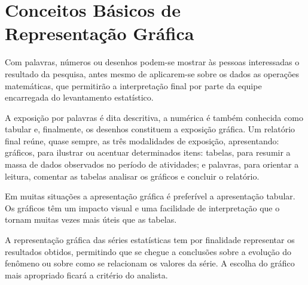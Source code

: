 







\section{Conceitos Básicos de Representação Gráfica}

\inic Com palavras, números ou desenhos podem-se mostrar às pessoas interessadas o resultado da pesquisa, antes mesmo de aplicarem-se sobre os dados as operações matemáticas, que permitirão a interpretação final por parte da equipe encarregada do levantamento estatístico.\vskip0.3cm

A exposição por palavras é dita descritiva, a numérica é também conhecida como tabular e, finalmente, os desenhos constituem a exposição gráfica. Um relatório final reúne, quase sempre, as três modalidades de exposição, apresentando: gráficos, para ilustrar ou acentuar determinados itens: tabelas, para resumir a massa de dados observados no período de atividades; e palavras, para orientar a leitura, comentar as tabelas analisar os gráficos e concluir o relatório.\vskip0.3cm

Em muitas situações a apresentação gráfica é preferível a apresentação tabular. Os gráficos têm um impacto visual e uma facilidade de interpretação que o tornam muitas vezes mais úteis que as tabelas.\vskip0.3cm

A representação gráfica das séries estatísticas tem por finalidade representar os resultados obtidos, permitindo que se chegue a conclusões sobre a evolução do fenômeno ou sobre como se relacionam os valores da série. A escolha do gráfico mais apropriado ficará a critério do analista.\vskip0.3cm

